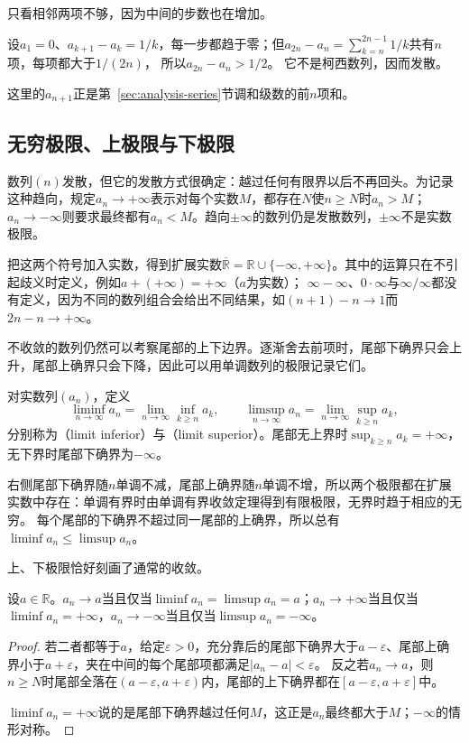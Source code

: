 只看相邻两项不够，因为中间的步数也在增加。
\begin{example}[相邻差趋于零的发散数列]
\label{ex:ru-harmonic-partial-sums-not-cauchy}
设$a_1=0$、$a_{k+1}-a_k=1/k$，每一步都趋于零；但$a_{2n}-a_n=\sum_{k=n}^{2n-1}1/k$共有$n$项，每项都大于$1/(2n)$，
所以$a_{2n}-a_n>1/2$。
它不是柯西数列，因而发散。
\end{example}
这里的$a_{n+1}$正是第~\ref{sec:analysis-series}节调和级数的前$n$项和。

\subsection{无穷极限、上极限与下极限}
\label{sec:ru-infinite-limits-limsup}

数列$(n)$发散，但它的发散方式很确定：越过任何有限界以后不再回头。为记录这种趋向，规定$a_n\to+\infty$表示对每个实数$M$，都存在$N$使$n\geq N$时$a_n>M$；
$a_n\to-\infty$则要求最终都有$a_n<M$。趋向$\pm\infty$的数列仍是发散数列，$\pm\infty$不是实数极限。

把这两个符号加入实数，得到扩展实数$\overline{\mathbb R}=\mathbb R\cup\{-\infty,+\infty\}$。其中的运算只在不引起歧义时定义，例如$a+(+\infty)=+\infty$（$a$为实数）；
$\infty-\infty$、$0\cdot\infty$与$\infty/\infty$都没有定义，因为不同的数列组合会给出不同结果，如$(n+1)-n\to1$而$2n-n\to+\infty$。

不收敛的数列仍然可以考察尾部的上下边界。逐渐舍去前项时，尾部下确界只会上升，尾部上确界只会下降，因此可以用单调数列的极限记录它们。
\begin{definition}[上极限与下极限]
\label{def:analysis-liminf-limsup}
对实数列$(a_n)$，定义
\[
 \liminf_{n\to\infty}a_n=\lim_{n\to\infty}\inf_{k\geq n}a_k,\qquad
 \limsup_{n\to\infty}a_n=\lim_{n\to\infty}\sup_{k\geq n}a_k,
\]
分别称为（limit inferior）与（limit superior）。尾部无上界时$\sup_{k\geq n}a_k=+\infty$，无下界时尾部下确界为$-\infty$。
\end{definition}
右侧尾部下确界随$n$单调不减，尾部上确界随$n$单调不增，所以两个极限都在扩展实数中存在：单调有界时由单调有界收敛定理得到有限极限，无界时趋于相应的无穷。
每个尾部的下确界不超过同一尾部的上确界，所以总有$\liminf a_n\leq\limsup a_n$。

上、下极限恰好刻画了通常的收敛。
\begin{theorem}[上下极限与收敛]
\label{thm:ru-limsup-convergence}
设$a\in\mathbb R$。$a_n\to a$当且仅当$\liminf a_n=\limsup a_n=a$；$a_n\to+\infty$当且仅当$\liminf a_n=+\infty$，$a_n\to-\infty$当且仅当$\limsup a_n=-\infty$。
\end{theorem}
\begin{proof}
若二者都等于$a$，给定$\varepsilon>0$，充分靠后的尾部下确界大于$a-\varepsilon$、尾部上确界小于$a+\varepsilon$，夹在中间的每个尾部项都满足$|a_n-a|<\varepsilon$。
反之若$a_n\to a$，则$n\geq N$时尾部全落在$(a-\varepsilon,a+\varepsilon)$内，尾部的上下确界都在$[a-\varepsilon,a+\varepsilon]$中。

$\liminf a_n=+\infty$说的是尾部下确界越过任何$M$，这正是$a_n$最终都大于$M$；$-\infty$的情形对称。
\end{proof}

